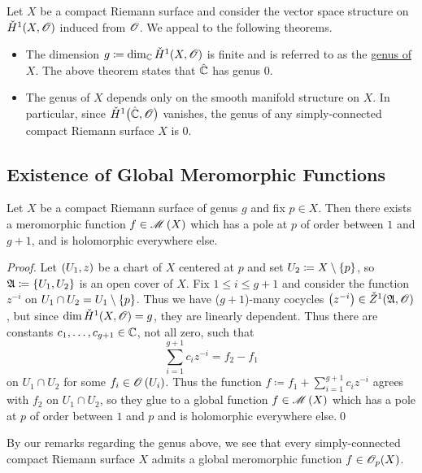\documentclass[../Moduli_Spaces_of_Riemann_Surfaces.tex]{subfiles}
\begin{document}
    \begin{remark}
        Let $X$ be a compact Riemann surface and consider the vector space structure on $\check{H}^1\!\left(X,\mathscr{O}\right)$ induced from $\mathscr{O}$. We appeal to the following theorems.
        \begin{itemize}
            \item The dimension $g\coloneqq\dim_{\mathbb{C}}\check{H}^1\!\left(X,\mathscr{O}\right)$ is finite and is referred to as the \ul{genus of $X$}. The above theorem states that $\hat{\mathbb{C}}$ has genus $0$.
                \vspace{-0.05in}
            \item The genus of $X$ depends only on the smooth manifold structure on $X$. In particular, since $\check{H}^1\big(\hat{\mathbb{C}},\mathscr{O}\big)$ vanishes, the genus of any simply-connected compact Riemann surface $X$ is $0$.\exqed
        \end{itemize}
    \end{remark}
    \subsection{Existence of Global Meromorphic Functions}
    \begin{theorem}
        Let $X$ be a compact Riemann surface of genus $g$ and fix $p\in X$. Then there exists a meromorphic function $f\in\mathscr{M}\left(X\right)$ which has a pole at $p$ of order between $1$ and $g+1$, and is holomorphic everywhere else.
    \end{theorem}
    \begin{proof}
        Let $\left(U_1,z\right)$ be a chart of $X$ centered at $p$ and set $U_2\coloneqq X\setminus\left\{p\right\}$, so $\mathfrak{A}\coloneqq\left\{U_1,U_2\right\}$ is an open cover of $X$. Fix $1\leq i\leq g+1$ and consider the function $z^{-i}$ on $U_1\cap U_2=U_1\setminus\left\{p\right\}$. Thus we have ($g+1$)-many cocycles $\left(z^{-i}\right)\in\check{Z}^1\!\left(\mathfrak{A},\mathscr{O}\right)$, but since $\dim\check{H}^1\!\left(X,\mathscr{O}\right)=g$, they are linearly dependent. Thus there are constants $c_1,\dots,c_{g+1}\in\mathbb{C}$, not all zero, such that
        \begin{equation*}
            \sum_{i=1}^{g+1}c_iz^{-i}=f_2-f_1
        \end{equation*}
        on $U_1\cap U_2$ for some $f_i\in\mathscr{O}\left(U_i\right)$. Thus the function $f\coloneqq f_1+\sum_{i=1}^{g+1}c_iz^{-i}$ agrees with $f_2$ on $U_1\cap U_2$, so they glue to a global function $f\in\mathscr{M}\left(X\right)$ which has a pole at $p$ of order between $1$ and $p$ and is holomorphic everywhere else.\qed
    \end{proof}
    \begin{remark}
        By our remarks regarding the genus above, we see that every simply-connected compact Riemann surface $X$ admits a global meromorphic function $f\in\mathscr{O}_p\!\left(X\right)$.\exqed
    \end{remark}
\end{document}

